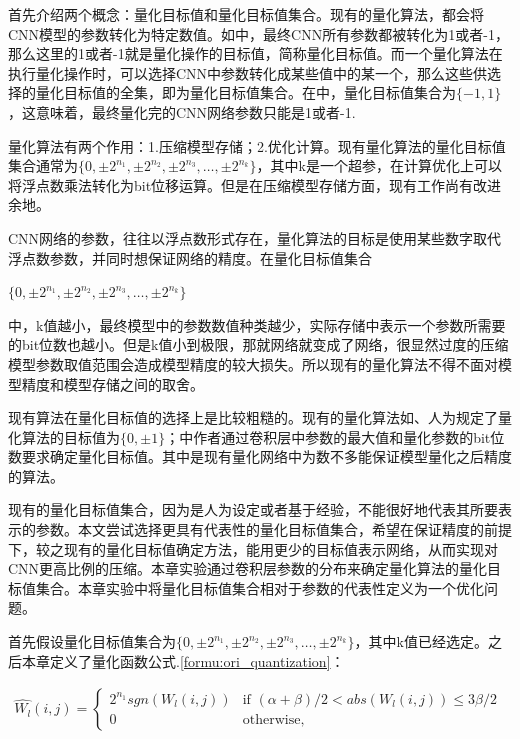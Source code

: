 \documentclass[ pdftex, oneside, master]{NJUthesis}
\begin{document}
首先介绍两个概念：量化目标值和量化目标值集合。现有的量化算法，都会将CNN模型的参数转化为特定数值。如\cite{binary}中，最终CNN所有参数都被转化为1或者-1，那么这里的1或者-1就是量化操作的目标值，简称量化目标值。而一个量化算法在执行量化操作时，可以选择CNN中参数转化成某些值中的某一个，那么这些供选择的量化目标值的全集，即为量化目标值集合。在\cite{binary}中，量化目标值集合为$\{ -1, 1\}$，这意味着，最终量化完的CNN网络参数只能是1或者-1.

量化算法有两个作用：1.压缩模型存储；2.优化计算。现有量化算法的量化目标值集合通常为$\{0,\pm2^{n_1},\pm2^{n_2}, \pm2^{n_3}, \dots,\pm2^{n_k}\}$，其中k是一个超参，在计算优化上可以将浮点数乘法转化为bit位移运算。但是在压缩模型存储方面，现有工作尚有改进余地。

CNN网络的参数，往往以浮点数形式存在，量化算法的目标是使用某些数字取代浮点数参数，并同时想保证网络的精度。在量化目标值集合

$\{0,\pm2^{n_1},\pm2^{n_2}, \pm2^{n_3}, \dots,\pm2^{n_k}\}$

\noindent 中，k值越小，最终模型中的参数数值种类越少，实际存储中表示一个参数所需要的bit位数也越小。但是k值小到极限，那就网络就变成了\cite{ternary}网络，很显然过度的压缩模型参数取值范围会造成模型精度的较大损失。所以现有的量化算法不得不面对模型精度和模型存储之间的取舍。

现有算法在量化目标值的选择上是比较粗糙的。现有的量化算法如\cite{binary}、\cite{ternary}人为规定了量化算法的目标值为$\{0, \pm1\}$；\cite{incremental}中作者通过卷积层中参数的最大值和量化参数的bit位数要求确定量化目标值。其中\cite{incremental}是现有量化网络中为数不多能保证模型量化之后精度的算法。

现有的量化目标值集合，因为是人为设定或者基于经验，不能很好地代表其所要表示的参数。本文尝试选择更具有代表性的量化目标值集合，希望在保证精度的前提下，较之现有的量化目标值确定方法，能用更少的目标值表示网络，从而实现对CNN更高比例的压缩。本章实验通过卷积层参数的分布来确定量化算法的量化目标值集合。本章实验中将量化目标值集合相对于参数的代表性定义为一个优化问题。

首先假设量化目标值集合为$\{0,\pm2^{n_1},\pm2^{n_2}, \pm2^{n_3}, \dots,\pm2^{n_k}\}$，其中k值已经选定。之后本章定义了量化函数公式.\ref{formu:ori_quantization}：

\begin{eqnarray}\label{equ:ori_quantization}
\hat{W_l}(i,j)=\begin{cases}
2^{n_1}sgn(W_l(i,j))&\text{if $(\alpha+\beta)/2<abs(W_l(i,j))\leq3\beta/2$}\\
0&\text{otherwise},
\end{cases}\
\label{formu:ori_quantization}
\end{eqnarray}
\end{document}
